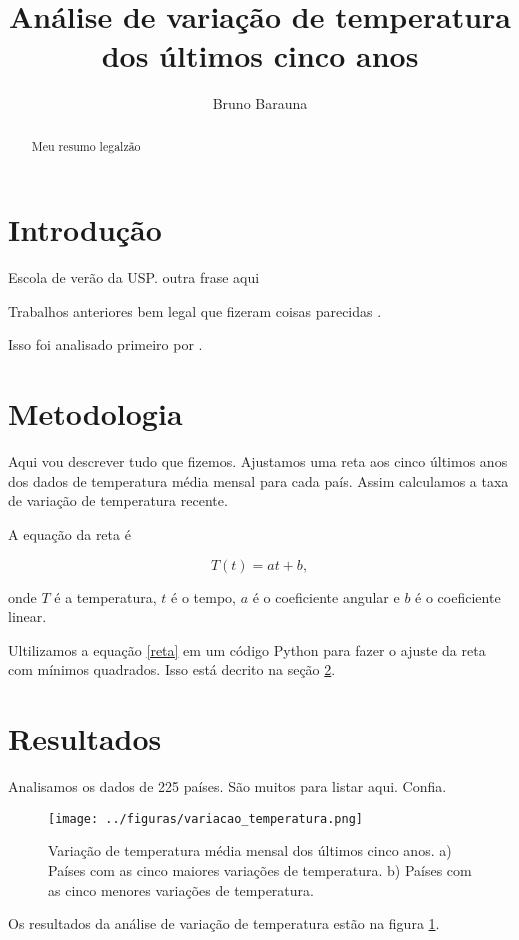 \documentclass{article}
\begin{document}
\title{Análise de variação de temperatura dos últimos cinco anos}
\author{Bruno Barauna}
\maketitle

\begin{abstract}
Meu resumo legalzão
\end{abstract}

\section{Introdução}

Escola de verão da USP.
outra frase aqui

Trabalhos anteriores bem legal que fizeram coisas parecidas
\citep{Hansen2010}.

Isso foi analisado primeiro por \citet{Hansen2010}.

\section{Metodologia}
\label{sec:metodos}
Aqui vou descrever tudo que fizemos.
Ajustamos uma reta aos cinco últimos anos dos dados
de temperatura média mensal para cada país.
Assim calculamos a taxa de variação de temperatura recente.

A equação da reta é

\begin{equation}
T(t) = a t +b,
\label{eq:reta}
\end{equation}

\noindent
onde $T$ é a temperatura, $t$ é o tempo, $a$ é o coeficiente angular e $b$ é o coeficiente linear.

Ultilizamos a equação \ref{reta} em um código Python para fazer o ajuste da 
reta com mínimos quadrados.
Isso está decrito na seção \ref{sec:metodos}.

\section{Resultados}
\label{sec:resultados}

Analisamos os dados de 225 países. São muitos para listar aqui. Confia.
\begin{figure}[!htb]
	\centering
	\texttt{[image: ../figuras/variacao\_temperatura.png]}
	\caption{
		Variação de temperatura média mensal dos últimos cinco anos.
		a) Países com as cinco maiores variações de temperatura.
		b) Países com as cinco menores variações de temperatura.
	}
	\label{fig:variacoes}
\end{figure}

Os resultados da análise de variação de temperatura estão na figura \ref{fig:variacoes}.



\end{document}
